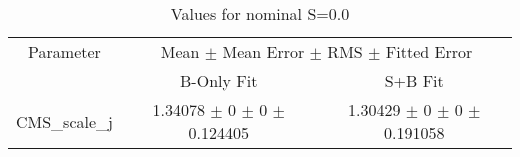 \begin{table}
\centering
\caption{Values for nominal S=0.0}
\begin{tabular}{ccc}
\toprule
Parameter & \multicolumn{2}{c}{Mean $\pm$ Mean Error $\pm$ RMS $\pm$ Fitted Error}\\
 & B-Only Fit & S+B Fit\\
\midrule
CMS\_scale\_j & \num{1.34078} $\pm$ \num{0} $\pm$ \num{0} $\pm$ \num{0.124405} & \num{1.30429} $\pm$ \num{0} $\pm$ \num{0} $\pm$ \num{0.191058}\\
\bottomrule
\end{tabular}
\end{table}